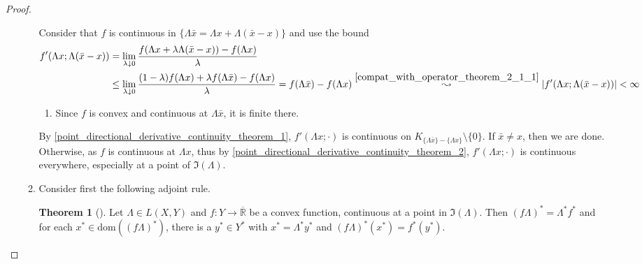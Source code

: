 \documentclass[10pt, leqno]{amsart}
\theoremstyle{definition}
\newtheorem{theorem}{Theorem}[section]
\theoremstyle{remark}
\begin{document}
\begin{proof}
\begin{enumerate}[label=(\roman*), wide]
\begin{enumerate}[label=(\alph*), wide]
                Consider that \(f\) is continuous in \(\{\Lambda \bar{x} = \Lambda x + \Lambda (\bar{x}-x)\}\) and use the bound
                \begin{align}
                    f'(\Lambda x; \Lambda (\bar{x}-x)) &= \lim_{\lambda \downarrow 0} \frac{f(\Lambda x + \lambda \Lambda (\bar{x}-x)) - f(\Lambda x)}{\lambda}\\
                    &\leq \lim_{\lambda \downarrow 0} \frac{(1-\lambda)f(\Lambda x) + \lambda f(\Lambda \bar{x}) - f(\Lambda x)}{\lambda} = f(\Lambda \bar{x}) - f(\Lambda x) \overset{\ref{compat_with_operator_theorem_2_1_1}}{\leadsto} |f'(\Lambda x; \Lambda (\bar{x}-x))| < \infty
                \end{align}
                \begin{enumerate}[label=(\arabic*), wide]
                    \item \label{compat_with_operator_theorem_2_1_1} Since \(f\) is convex and continuous at \(\Lambda \bar{x}\), it is finite there.
                \end{enumerate}
                By  \ref{point_directional_derivative_continuity_theorem_1}, \(f'(\Lambda x; \cdot)\) is continuous on \(K_{\{\Lambda \bar{x}\} - \{\Lambda x\}} \setminus \{0\}\). If \(\bar{x} \neq x\), then we are done. Otherwise, as \(f\) is continuous at \(\Lambda x\), thus by  \ref{point_directional_derivative_continuity_theorem_2}, \(f'(\Lambda x; \cdot)\) is continuous everywhere, especially at a point of \(\Im(\Lambda)\).
                \item \label{compat_with_operator_theorem_2_2} Consider first the following adjoint rule.

                \begin{edgebox}
                    \begin{theorem}[{\cite[p. 179, p. 183]{IoffeTihomirov}}] \label{adjoint_calculation_rule}
                        Let \(\Lambda \in L(X, Y)\) and \(f\colon Y \to \overline{\mathbb{R}}\) be a convex function, continuous at a point in \(\Im(\Lambda)\). Then \((f\Lambda)^* = \Lambda^* f^*\) and for each \(x^* \in \text{dom}((f\Lambda)^*)\), there is a \(y^* \in Y^*\) with \(x^* = \Lambda^*y^*\) and \((f\Lambda)^*(x^*) = f^*(y^*)\).
                    \end{theorem}
                \end{edgebox}
    

\end{enumerate}
\end{enumerate}
\end{proof}
\end{document}
